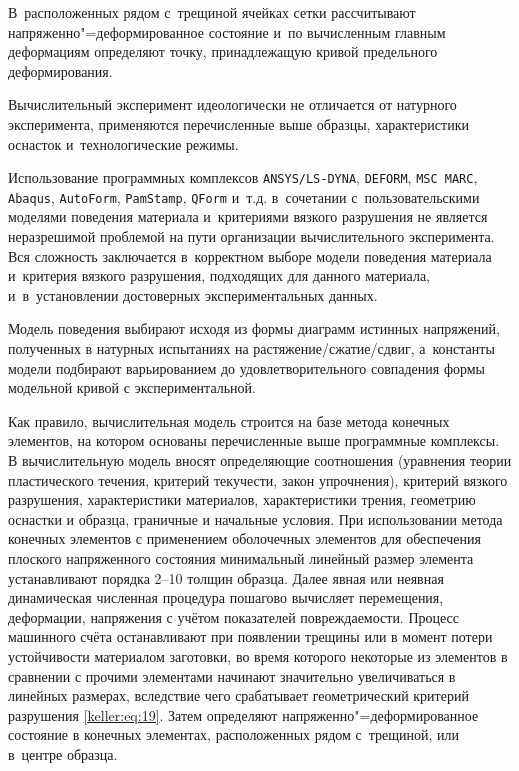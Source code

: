 В~расположенных рядом с~трещиной ячейках сетки рассчитывают напряженно"=деформированное состояние и~по вычисленным главным деформациям определяют точку, принадлежащую кривой предельного деформирования. 



Вычислительный эксперимент идеологически не отличается от натурного эксперимента, применяются перечисленные выше образцы, характеристики оснасток и~технологические режимы. 

Использование программных комплексов {\tt ANSYS/LS-DYNA}, {\tt DEFORM}, {\tt MSC MARC}, {\tt Abaqus}, {\tt AutoForm}, {\tt PamStamp}, {\tt QForm} и~т.д. в~сочетании с~пользовательскими моделями поведения материала и~критериями вязкого разрушения не является неразрешимой проблемой на пути организации вычислительного эксперимента. Вся сложность заключается в~корректном выборе модели  поведения материала и~критерия вязкого разрушения, подходящих для данного материала, и~в~установлении достоверных экспериментальных данных. 

Модель поведения выбирают исходя из формы диаграмм истинных напряжений, полученных в натурных испытаниях на растяжение/сжатие/сдвиг, а~константы модели подбирают варьированием до удовлетворительного совпадения формы модельной кривой с экспериментальной. 



Как правило, вычислительная модель строится на базе метода конечных элементов, на котором основаны перечисленные выше программные комплексы. В вычислительную модель вносят определяющие соотношения (уравнения теории пластического течения, критерий текучести, закон упрочнения), критерий вязкого разрушения, характеристики материалов, характеристики трения, геометрию оснастки и образца, граничные и начальные условия. При использовании метода конечных элементов с применением оболочечных элементов для обеспечения плоского напряженного состояния минимальный линейный размер элемента устанавливают порядка 2--10 толщин образца. Далее явная или неявная динамическая численная процедура пошагово вычисляет перемещения, деформации, напряжения с учётом показателей повреждаемости. Процесс машинного счёта останавливают при появлении трещины или в момент потери устойчивости материалом заготовки, во время которого некоторые из элементов в сравнении с прочими элементами начинают значительно увеличиваться в линейных размерах, вследствие чего срабатывает геометрический критерий разрушения \eqref{keller:eq:19}. Затем определяют напряженно"=деформированное состояние в конечных элементах, расположенных рядом с~трещиной, или в~центре образца. 

